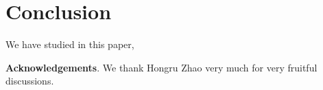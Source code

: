\documentclass[conference,letterpaper]{IEEEtran}
\numberwithin{equation}{section}
\newcommand{\lbl}{\label}
\begin{document}
\section{Conclusion}\lbl{sec:conclusion}

We have studied in this paper, 


\noindent\textbf{Acknowledgements}. We thank Hongru Zhao very much for very fruitful   discussions.




%
%
%
%
%
%
%
%
%
%
%
\end{document}
